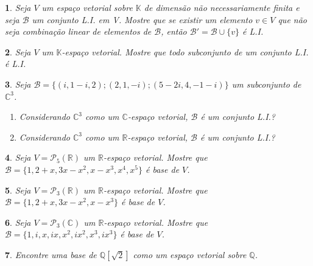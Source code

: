 \documentclass[12pt]{exam}
\newtheorem{exercicio}{}
\newcommand{\rac}{\mathbb{Q}}
\newcommand{\real}{\mathbb{R}}
\newcommand{\complex}{\mathbb{C}}
\newcommand{\cp}[1]{\mathbb{#1}}
\begin{document}
\begin{exercicio}
  Seja $V$ um espa\c{c}o vetorial sobre $\cp{K}$ de dimens\~ao n\~ao necessariamente finita e seja $\mathcal{B}$ um conjunto L.I. em V. Mostre que se existir um elemento $v \in V$ que n\~ao seja combina\c{c}\~ao linear de elementos de $\mathcal{B}$, ent\~ao $\mathcal{B}' = \mathcal{B} \cup \{v\}$ \'e L.I.
\end{exercicio}

\begin{exercicio}
  Seja $V$ um $\cp{K}$-espa\c{c}o vetorial. Mostre que todo subconjunto de um conjunto L.I. \'e L.I.
\end{exercicio}

\begin{exercicio}
  Seja $\mathcal{B} = \{(i, 1-i, 2); (2,1,-i);(5-2i,4,-1-i)\}$ um subconjunto de $\complex^3$.
  \begin{enumerate}[label={\alph*})]
    \item Considerando $\complex^3$ como um $\complex$-espa\c{c}o vetorial, $\mathcal{B}$ \'e um conjunto L.I.?
    \item Considerando $\complex^3$ como um $\real$-espa\c{c}o vetorial, $\mathcal{B}$ \'e um conjunto L.I.?
  \end{enumerate}
\end{exercicio}

\begin{exercicio}
  Seja $V = \mathcal{P}_5(\real)$ um $\real$-espaço vetorial. Mostre que $\mathcal{B} = \{1, 2+x, 3x-x^2,x-x^3, x^4, x^5\}$ \'e base de $V$.
\end{exercicio}

\begin{exercicio}
  Seja $V = \mathcal{P}_3(\real)$ um $\real$-espaço vetorial. Mostre que $\mathcal{B} = \{1, 2+x, 3x-x^2,x-x^3\}$ \'e base de $V$.
\end{exercicio}

\begin{exercicio}
  Seja $V = \mathcal{P}_3(\complex)$ um $\real$-espaço vetorial. Mostre que $\mathcal{B} = \{1, i, x, ix, x^2, ix^2, x^3, ix^3\}$ \'e base de $V$.
\end{exercicio}

\begin{exercicio}
  Encontre uma base de $\rac[\sqrt{2}]$ como um espa\c{c}o vetorial sobre $\rac$.
\end{exercicio}
\end{document}
